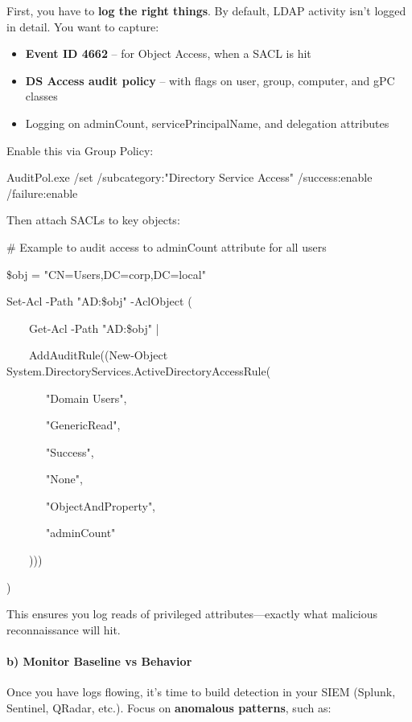 {{First, you have to \textbf{log the right things}. By default, LDAP activity isn’t logged in detail. You want to capture:

\begin{itemize}
    \item \textbf{Event ID 4662} – for Object Access, when a SACL is hit

    \item \textbf{DS Access audit policy} – with flags on user, group, computer, and gPC classes

    \item Logging on adminCount, servicePrincipalName, and delegation attributes

\end{itemize}
Enable this via Group Policy:

 

 

AuditPol.exe /set /subcategory:"Directory Service Access" /success:enable /failure:enable

Then attach SACLs to key objects:

 

 

\# Example to audit access to adminCount attribute for all users

\$obj = "CN=Users,DC=corp,DC=local"

Set-Acl -Path "AD:\$obj" -AclObject (

    Get-Acl -Path "AD:\$obj" | 

    AddAuditRule((New-Object System.DirectoryServices.ActiveDirectoryAccessRule(

       "Domain Users",

       "GenericRead",

       "Success",

       "None",

       "ObjectAndProperty",

       "adminCount"

    )))

)

This ensures you log reads of privileged attributes—exactly what malicious reconnaissance will hit.

\paragraph{\textbf{   b) Monitor Baseline vs Behavior}}

Once you have logs flowing, it’s time to build detection in your SIEM (Splunk, Sentinel, QRadar, etc.). Focus on \textbf{anomalous patterns}, such as:

}}
